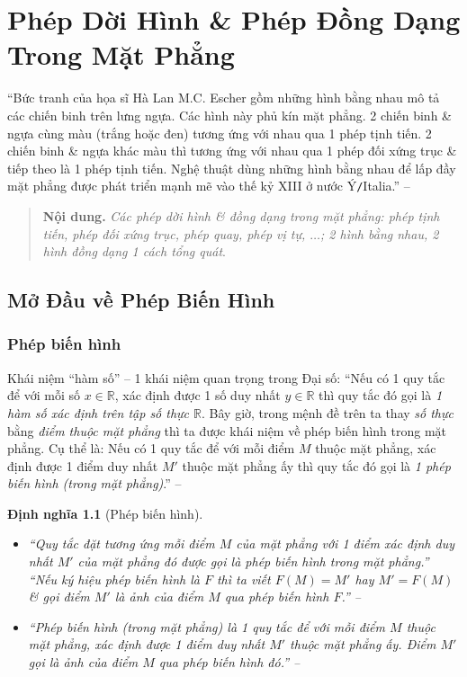 \documentclass[oneside]{book}
\numberwithin{equation}{section}
\newtheorem{dinhnghia}{Định nghĩa}[section]
\begin{document}
\chapter{Phép Dời Hình \& Phép Đồng Dạng Trong Mặt Phẳng}

``Bức tranh của họa sĩ Hà Lan M.C. Escher gồm những hình bằng nhau mô tả các chiến binh trên lưng ngựa. Các hình này phủ kín mặt phẳng. 2 chiến binh \& ngựa cùng màu (trắng hoặc đen) tương ứng với nhau qua 1 phép tịnh tiến. 2 chiến binh \& ngựa khác màu thì tương ứng với nhau qua 1 phép đối xứng trục \& tiếp theo là 1 phép tịnh tiến. Nghệ thuật dùng những hình bằng nhau để lấp đầy mặt phẳng được phát triển mạnh mẽ vào thế kỷ XIII ở nước Ý\texttt{/}Italia.'' -- \cite[p. 3]{SGK_Toan_11_hinh_hoc_nang_cao}

\begin{quotation}
	\textbf{Nội dung.} \textit{Các phép dời hình \& đồng dạng trong mặt phẳng: phép tịnh tiến, phép đối xứng trục, phép quay, phép vị tự, $\ldots$; 2 hình bằng nhau, 2 hình đồng dạng 1 cách tổng quát}.
\end{quotation}

\section{Mở Đầu về Phép Biến Hình}

\subsection{Phép biến hình}
Khái niệm ``hàm số'' -- 1 khái niệm quan trọng trong Đại số: ``Nếu có 1 quy tắc để với mỗi số $x\in\mathbb{R}$, xác định được 1 số duy nhất $y\in\mathbb{R}$ thì quy tắc đó gọi là \textit{1 hàm số xác định trên tập số thực $\mathbb{R}$}. Bây giờ, trong mệnh đề trên ta thay \textit{số thực} bằng \textit{điểm thuộc mặt phẳng} thì ta được khái niệm về phép biến hình trong mặt phẳng. Cụ thể là: Nếu có 1 quy tắc để với mỗi điểm $M$ thuộc mặt phẳng, xác định được 1 điểm duy nhất $M'$ thuộc mặt phẳng ấy thì quy tắc đó gọi là \textit{1 phép biến hình (trong mặt phẳng)}.'' -- \cite[p. 4]{SGK_Toan_11_hinh_hoc_nang_cao}

\begin{dinhnghia}[Phép biến hình]
	\begin{itemize}
		\item ``Quy tắc đặt tương ứng mỗi điểm $M$ của mặt phẳng với 1 điểm xác định duy nhất $M'$ của mặt phẳng đó được gọi là \emph{phép biến hình} trong mặt phẳng.'' ``Nếu ký hiệu phép biến hình là $F$ thì ta viết $F(M) = M'$ hay $M' = F(M)$ \& gọi điểm $M'$ là \emph{ảnh} của điểm $M$ qua phép biến hình $F$.'' -- \cite[p. 4]{SGK_Toan_11_hinh_hoc_co_ban}
		\item ``\emph{Phép biến hình} (trong mặt phẳng) là 1 quy tắc để với mỗi điểm $M$ thuộc mặt phẳng, xác định được 1 điểm duy nhất $M'$ thuộc mặt phẳng ấy. Điểm $M'$ gọi là \emph{ảnh} của điểm $M$ qua phép biến hình đó.'' -- \cite[p. 4]{SGK_Toan_11_hinh_hoc_nang_cao}
	\end{itemize}	
\end{dinhnghia}
\end{document}
